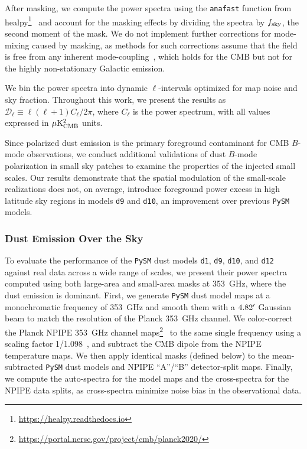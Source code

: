 \documentclass[twocolumn]{aastex631}
\begin{document}
After masking, we compute the power spectra using the \texttt{anafast} function from healpy\footnote{\url{https://healpy.readthedocs.io}}~\citep{Zonca:2019} and account for the masking effects by dividing the spectra by $f_{\rm sky}$, the second moment of the mask. We do not implement further corrections for mode-mixing caused by masking, as methods for such corrections assume that the field is free from any inherent mode-coupling~\citep[e.g.,][]{Hivon:2002}, which holds for the CMB but not for the highly non-stationary Galactic emission. 

We bin the power spectra into dynamic $\ell$-intervals optimized for map noise and sky fraction. Throughout this work, we present the results as $\mathcal{D}_\ell \equiv \ell(\ell + 1) C_\ell / 2\pi$, where $C_\ell$ is the power spectrum, with all values expressed in $\mu{\rm K^2_{CMB}}$ units. 

Since polarized dust emission is the primary foreground contaminant for CMB $B$-mode observations, we conduct additional validations of dust $B$-mode polarization in small sky patches to examine the properties of the injected small scales. Our results demonstrate that the spatial modulation of the small-scale realizations does not, on average, introduce foreground power excess in high latitude sky regions in models \texttt{d9} and  \texttt{d10}, an improvement over previous \texttt{PySM} models.

\subsubsection{Dust Emission Over the Sky} 
\label{sec:dust_validation}
To evaluate the performance of the \texttt{PySM} dust models \texttt{d1}, \texttt{d9}, \texttt{d10}, and \texttt{d12} against real data across a wide range of scales, we present their power spectra computed using both large-area and small-area masks at 353~GHz, where the dust emission is dominant. First, we generate \texttt{PySM} dust model maps at a monochromatic frequency of 353~GHz and smooth them with a $4.82\mbox{$^\prime$}$ Gaussian beam to match the resolution of the Planck 353~GHz channel. We color-correct the Planck NPIPE 353~GHz channel maps\footnote{\url{https://portal.nersc.gov/project/cmb/planck2020/}}~\citep{PlanckCollaboration:2020} to the same single frequency using a scaling factor 1/1.098~\citep{planck2016-l11A}, and subtract the CMB dipole from the NPIPE temperature maps. We then apply identical masks (defined below) to the mean-subtracted \texttt{PySM} dust models and NPIPE ``A''/``B'' detector-split maps. Finally, we compute the auto-spectra for the model maps and the cross-spectra for the NPIPE data splits, as cross-spectra minimize noise bias in the observational data. 
\end{document}
